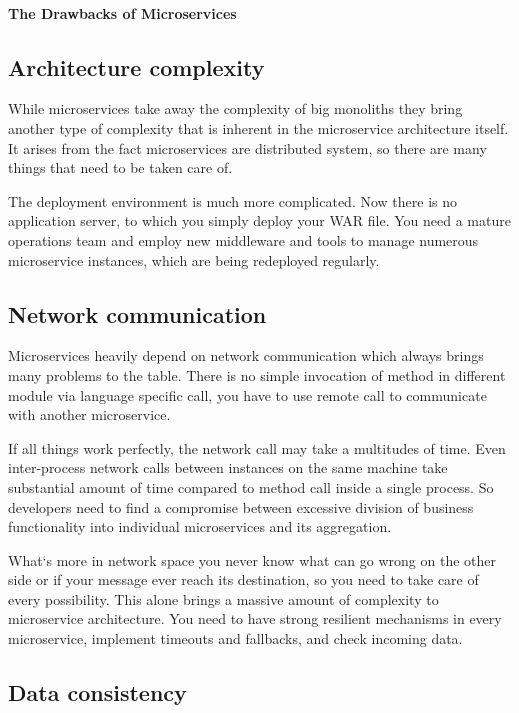 \documentclass[12pt,oneside]{fithesis2}
\begin{document}
\paragraph{The Drawbacks of Microservices}

\subsection{Architecture complexity}

While microservices take away the complexity of big monoliths they bring another type of complexity that is inherent in the microservice architecture itself. It arises from the fact microservices are distributed system, so there are many things that need to be taken care of.

The deployment environment is much more complicated. Now there is no application server, to which you simply deploy your WAR file. You need a mature operations team and employ new middleware and tools to manage numerous microservice instances, which are being redeployed regularly.

\subsection{Network communication}

Microservices heavily depend on network communication which always brings many problems to the table. There is no simple invocation of method in different module via language specific call, you have to use remote call to communicate with another microservice.

If all things work perfectly, the network call may take a multitudes of time. Even inter-process network calls between instances on the same machine take substantial amount of time compared to method call inside a single process. So developers need to find a compromise between excessive division of business functionality into individual microservices and its aggregation.

What`s more in network space you never know what can go wrong on the other side or if your message ever reach its destination, so you need to take care of every possibility. This alone brings a massive amount of complexity to microservice architecture. You need to have strong resilient mechanisms in every microservice, implement timeouts and fallbacks, and check incoming data.

\subsection{Data consistency}
\end{document}
